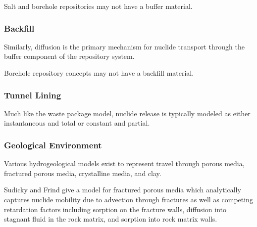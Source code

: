 Salt and borehole repositories may not have a buffer material.

\subsubsection{Backfill}
Similarly, diffusion is the primary mechanism for nuclide transport 
through the buffer component of the repository system.

Borehole repository concepts may not have a backfill material. 

\subsubsection{Tunnel Lining}
Much like the waste package model, nuclide release is typically 
modeled as either instantaneous and total or constant and partial. 

\subsubsection{Geological Environment}
Various hydrogeological models exist to represent travel through 
porous media, fractured porous media, crystalline media, and clay.

Sudicky and Frind give a model for fractured porous media which 
analytically captures nuclide mobility due to advection through 
fractures as well as competing retardation factors including sorption on the 
fracture walls, diffusion into stagnant fluid in the rock matrix, and 
sorption into rock matrix walls. 

